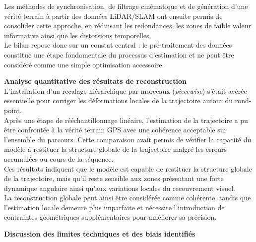 \documentclass[12pt,a4paper,oneside]{report}
\begin{document}
\hspace*{.3cm}Les méthodes de synchronisation, de filtrage cinématique et de génération d'une vérité terrain à partir des données LiDAR/SLAM ont ensuite permis de consolider cette approche, en réduisant les redondances, les zones de faible valeur informative ainsi que les distorsions temporelles.\\

\hspace*{.3cm}Le bilan repose donc sur un constat central : le pré-traitement des données constitue une étape fondamentale du processus d'estimation et ne peut être considéré comme une simple optimisation accessoire.

\par\bigskip
\par\bigskip

\hspace*{0.4cm}\textbf{Analyse quantitative des résultats de reconstruction}\\

\hspace*{.3cm}L'installation d'un recalage hiérarchique par morceaux (\textit{piecewise}) s'était avérée essentielle pour corriger les déformations locales de la trajectoire autour du rond-point.\\
Après une étape de rééchantillonnage linéaire, l'estimation de la trajectoire a pu être confrontée à la vérité terrain GPS avec une cohérence acceptable sur l'ensemble du parcours. Cette comparaison avait permis de vérifier la capacité du modèle à restituer la structure globale de la trajectoire malgré les erreurs accumulées au cours de la séquence.\\

\hspace*{.3cm}Ces résultats indiquent que le modèle est capable de restituer la structure globale de la trajectoire, mais qu'il reste sensible aux zones présentant une forte dynamique angulaire ainsi qu'aux variations locales du recouvrement visuel.\\
\hspace*{.3cm}La reconstruction globale peut ainsi être considérée comme cohérente, tandis que l'estimation locale demeure plus imparfaite et nécessite l'introduction de contraintes géométriques supplémentaires pour améliorer sa précision.

\par\bigskip
\par\bigskip

\hspace*{0.4cm}\textbf{Discussion des limites techniques et des biais identifiés}\\
\end{document}
